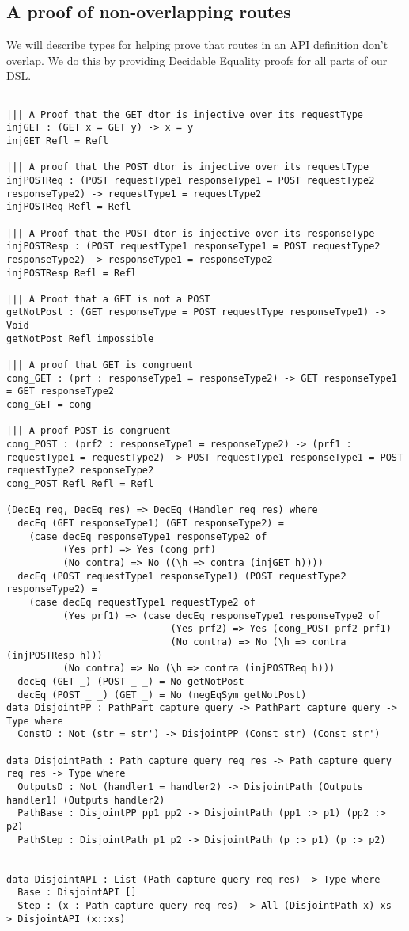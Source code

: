 \documentclass[12pt,a4paper]{article}
\begin{document}
\subsection{A proof of non-overlapping routes}
We will describe types for helping prove that routes in an API definition don't overlap.  We do this
by providing Decidable Equality proofs for all parts of our DSL.
\begin{verbatim}

||| A Proof that the GET dtor is injective over its requestType
injGET : (GET x = GET y) -> x = y
injGET Refl = Refl

||| A proof that the POST dtor is injective over its requestType
injPOSTReq : (POST requestType1 responseType1 = POST requestType2 responseType2) -> requestType1 = requestType2
injPOSTReq Refl = Refl

||| A Proof that the POST dtor is injective over its responseType
injPOSTResp : (POST requestType1 responseType1 = POST requestType2 responseType2) -> responseType1 = responseType2
injPOSTResp Refl = Refl

||| A Proof that a GET is not a POST
getNotPost : (GET responseType = POST requestType responseType1) -> Void
getNotPost Refl impossible

||| A proof that GET is congruent
cong_GET : (prf : responseType1 = responseType2) -> GET responseType1 = GET responseType2
cong_GET = cong

||| A proof POST is congruent
cong_POST : (prf2 : responseType1 = responseType2) -> (prf1 : requestType1 = requestType2) -> POST requestType1 responseType1 = POST requestType2 responseType2
cong_POST Refl Refl = Refl

(DecEq req, DecEq res) => DecEq (Handler req res) where
  decEq (GET responseType1) (GET responseType2) =
    (case decEq responseType1 responseType2 of
          (Yes prf) => Yes (cong prf)
          (No contra) => No ((\h => contra (injGET h))))
  decEq (POST requestType1 responseType1) (POST requestType2 responseType2) =
    (case decEq requestType1 requestType2 of
          (Yes prf1) => (case decEq responseType1 responseType2 of
                             (Yes prf2) => Yes (cong_POST prf2 prf1)
                             (No contra) => No (\h => contra (injPOSTResp h)))
          (No contra) => No (\h => contra (injPOSTReq h)))
  decEq (GET _) (POST _ _) = No getNotPost
  decEq (POST _ _) (GET _) = No (negEqSym getNotPost)
data DisjointPP : PathPart capture query -> PathPart capture query -> Type where
  ConstD : Not (str = str') -> DisjointPP (Const str) (Const str')

data DisjointPath : Path capture query req res -> Path capture query req res -> Type where
  OutputsD : Not (handler1 = handler2) -> DisjointPath (Outputs handler1) (Outputs handler2)
  PathBase : DisjointPP pp1 pp2 -> DisjointPath (pp1 :> p1) (pp2 :> p2)
  PathStep : DisjointPath p1 p2 -> DisjointPath (p :> p1) (p :> p2)


data DisjointAPI : List (Path capture query req res) -> Type where
  Base : DisjointAPI []
  Step : (x : Path capture query req res) -> All (DisjointPath x) xs -> DisjointAPI (x::xs)
\end{verbatim}
\end{document}

